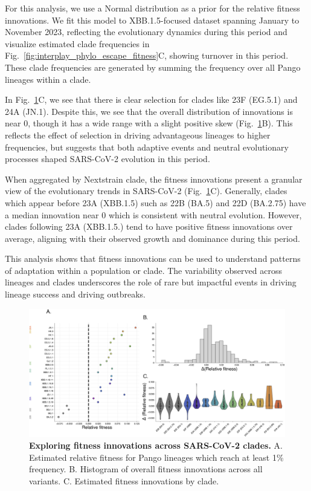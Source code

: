 For this analysis, we use a Normal distribution as a prior for the relative fitness innovations.
We fit this model to XBB.1.5-focused dataset spanning January to November 2023, reflecting the evolutionary dynamics during this period and visualize estimated clade frequencies in Fig.~\ref{fig:interplay_phylo_escape_fitness}C, showing turnover in this period.
These clade frequencies are generated by summing the frequency over all Pango lineages within a clade.

In Fig.~\ref{fig:exploring-fitness-innovations}C, we see that there is clear selection for clades like 23F (EG.5.1) and 24A (JN.1).
Despite this, we see that the overall distribution of innovations is near 0, though it has a wide range with a slight positive skew (Fig.~\ref{fig:exploring-fitness-innovations}B).
This reflects the effect of selection in driving advantageous lineages to higher frequencies, but suggests that both adaptive events and neutral evolutionary processes shaped SARS-CoV-2 evolution in this period.

When aggregated by Nextstrain clade, the fitness innovations present a granular view of the evolutionary trends in SARS-CoV-2 (Fig.~\ref{fig:exploring-fitness-innovations}C).
Generally, clades which appear before 23A (XBB.1.5) such as 22B (BA.5) and 22D (BA.2.75) have a median innovation near 0 which is consistent with neutral evolution.
However, clades following 23A (XBB.1.5.) tend to have positive fitness innovations over average, aligning with their observed growth and dominance during this period. 

This analysis shows that fitness innovations can be used to understand patterns of adaptation within a population or clade.
The variability observed across lineages and clades underscores the role of rare but impactful events in driving lineage success and driving outbreaks.

\begin{figure}[h]
	\centering
	\includegraphics[width=1.0\textwidth]{./figures/exploring-fitness-innovations.png}
	\caption[\textbf{Exploring fitness innovations across SARS-CoV-2 clades.}]{
	    \textbf{Exploring fitness innovations across SARS-CoV-2 clades.}
	    A. Estimated relative fitness for Pango lineages which reach at least 1\% frequency.
	    B. Histogram of overall fitness innovations across all variants.
	    C. Estimated fitness innovations by clade.
	}
	\label{fig:exploring-fitness-innovations}
\end{figure}

